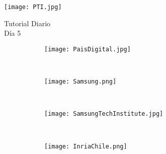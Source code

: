 \begin{titlepage} %
  \thispagestyle{empty} %
  \begin{flushleft} %
    \texttt{[image: PTI.jpg]}
  \end{flushleft}
  \vfill
  \vspace{2cm} %
  \begin{center} %
    {
      \Huge Tutorial Diario\\
      \huge Día 5
    }
  \end{center}

  \vspace{5cm}

  \begin{figure}[H]
    \centering
    \begin{subfigure}[b]{0.2\textwidth}
      \centering
      \texttt{[image: PaisDigital.jpg]}
      \label{fig:Viper}
    \end{subfigure}
    ~
    \begin{subfigure}[b]{0.4\textwidth}
      \centering
      \texttt{[image: Samsung.png]}
      \label{fig:Phyrex}
    \end{subfigure}
    ~
    \begin{subfigure}[b]{0.23\textwidth}
      \centering
      \texttt{[image: SamsungTechInstitute.jpg]}
      \label{fig:Viper}
    \end{subfigure}
    ~\\
    \begin{subfigure}[b]{0.4\textwidth}
      \centering
      \texttt{[image: InriaChile.png]}
      \label{fig:Phyrex}
    \end{subfigure}
  \end{figure}

  \vfill
\end{titlepage}
